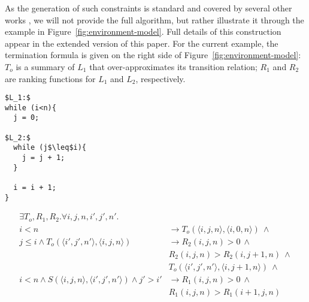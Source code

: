 \documentclass[a4paper]{llncs}
\begin{document}

As the generation of such constraints is standard and covered by several other works \cite{DBLP:conf/pldi/GrebenshchikovLPR12,DBLP:conf/pldi/GulwaniSV08}, 
we will not provide the full algorithm, but rather illustrate it through the example in Figure~\ref{fig:environment-model}.
Full details of this construction appear in the extended version of this paper.
For the current example, the termination formula is given on the right side of 
Figure~\ref{fig:environment-model}:
$T_o$ is a summary of $L_1$ that over-approximates its transition relation;
$R_1$ and $R_2$ are ranking functions for $L_1$ and $L_2$, respectively.



\begin{figure*}
\begin{framed}
\begin{minipage}{0.17\textwidth}
\begin{lstlisting}[mathescape=true]
$L_1:$
while (i<n){
  j = 0;

$L_2:$
  while (j$\leq$i){
    j = j + 1;
  }

  i = i + 1;
}
\end{lstlisting}
\end{minipage}
\vline
\begin{minipage}{0.82\textwidth}
\begin{align*}
 \exists T_o, R_1, R_2 . \forall i, j, n, i', j', n' . \\
   i < n & \rightarrow T_o(\langle i, j, n \rangle , \langle i, 0, n \rangle) ~ \wedge \\
   j \leq i \wedge T_o(\langle i', j', n' \rangle, \langle i, j, n\rangle ) & \rightarrow R_2(i, j, n) > 0 ~ \wedge \\
     & R_2(i, j, n) > R_2(i, j+1, n) ~ \wedge \\
     & T_o(\langle i', j', n' \rangle, \langle i, j+1, n \rangle) ~ \wedge \\
   i < n \wedge S(\langle i, j, n \rangle, \langle i', j', n' \rangle) \wedge j' > i' & \rightarrow R_1(i, j, n) > 0 ~ \wedge \\
                                         & R_1(i, j, n) > R_1(i+1, j, n)
   \end{align*}
\end{minipage}
\end{framed}
\caption{A program with nested loops and its termination formula\label{fig:environment-model}}
\end{figure*}
\end{document}
